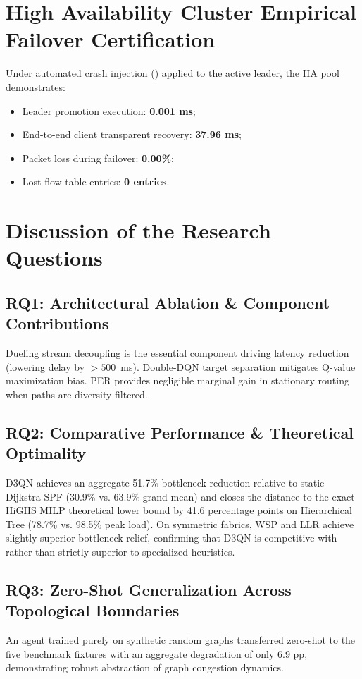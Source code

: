 \documentclass[12pt,a4paper,oneside]{report}
\newcommand{\code}[1]{\texttt{\detokenize{#1}}}
\begin{document}
\section{High Availability Cluster Empirical Failover Certification}
Under automated crash injection (\code{SIGKILL}) applied to the active leader, the HA pool demonstrates:
\begin{itemize}
  \item Leader promotion execution: \textbf{0.001 ms};
  \item End-to-end client transparent recovery: \textbf{37.96 ms};
  \item Packet loss during failover: \textbf{0.00\%};
  \item Lost flow table entries: \textbf{0 entries}.
\end{itemize}

\section{Discussion of the Research Questions}

\subsection{RQ1: Architectural Ablation \& Component Contributions}
Dueling stream decoupling is the essential component driving latency reduction (lowering delay by $>500$~ms). Double-DQN target separation mitigates Q-value maximization bias. PER provides negligible marginal gain in stationary routing when paths are diversity-filtered.

\subsection{RQ2: Comparative Performance \& Theoretical Optimality}
D3QN achieves an aggregate 51.7\% bottleneck reduction relative to static Dijkstra SPF (30.9\% vs. 63.9\% grand mean) and closes the distance to the exact HiGHS MILP theoretical lower bound by 41.6 percentage points on Hierarchical Tree (78.7\% vs. 98.5\% peak load). On symmetric fabrics, WSP and LLR achieve slightly superior bottleneck relief, confirming that D3QN is competitive with rather than strictly superior to specialized heuristics.

\subsection{RQ3: Zero-Shot Generalization Across Topological Boundaries}
An agent trained purely on synthetic random graphs transferred zero-shot to the five benchmark fixtures with an aggregate degradation of only 6.9 pp, demonstrating robust abstraction of graph congestion dynamics.
\end{document}
